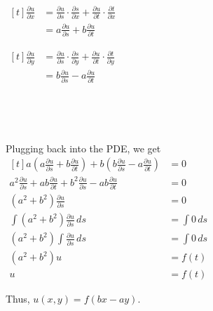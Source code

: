 \begin{enumerate}
    {~~~}

    {~~~}
    
    \begin{minipage}[t]{0.45\linewidth}
        $\begin{aligned}[t]
            \frac{\partial u}{\partial x}
             & = \frac{\partial u}{\partial s} \cdot \frac{\partial s}{\partial x} + \frac{\partial u}{\partial t} \cdot \frac{\partial t}{\partial x} \\
             & = a \frac{\partial u}{\partial s} + b \frac{\partial u}{\partial t}
        \end{aligned}$
    \end{minipage}
    \begin{minipage}[t]{0.45\linewidth}
        $\begin{aligned}[t]
            \frac{\partial u}{\partial y}
             & = \frac{\partial u}{\partial s} \cdot \frac{\partial s}{\partial y} + \frac{\partial u}{\partial t} \cdot \frac{\partial t}{\partial y} \\
             & = b \frac{\partial u}{\partial s} - a \frac{\partial u}{\partial t}
        \end{aligned}$
    \end{minipage}

    {~~~}

    {~~~}

    Plugging back into the PDE, we get $\begin{aligned}[t]
        a \left( a \frac{\partial u}{\partial s} + b \frac{\partial u}{\partial t} \right) + b \left( b \frac{\partial u}{\partial s} - a \frac{\partial u}{\partial t} \right) & = 0 \\
        a^2 \frac{\partial u}{\partial s} + ab \frac{\partial u}{\partial t} + b^2 \frac{\partial u}{\partial s} - ab \frac{\partial u}{\partial t} & = 0 \\
        (a^2 + b^2) \frac{\partial u}{\partial s}           & = 0           \\
        \int (a^2 + b^2) \frac{\partial u}{\partial s} \,ds & = \int 0 \,ds \\
        (a^2 + b^2) \int \frac{\partial u}{\partial s} \,ds & = \int 0 \,ds \\
        (a^2 + b^2) u                                       & = f(t)        \\
        u                                                   & = f(t)
    \end{aligned}$

    Thus, $u(x, y) = f(bx - ay)$. 
    

\end{enumerate}
